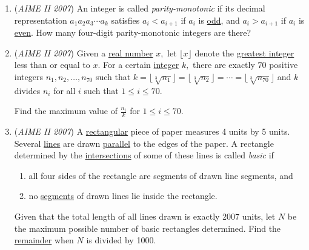\begin{enumerate}
 

	\item (\textit{AIME II 2007}) An integer is called \textit{parity-monotonic} if its decimal representation $a_{1}a_{2}a_{3}\cdots a_{k}$ satisfies $a_{i}<a_{i+1}$ if $a_{i}$ is \href{https://artofproblemsolving.com/wiki/index.php?title=Odd}{odd}, and $a_{i}>a_{i+1}$ if $a_{i}$ is \href{https://artofproblemsolving.com/wiki/index.php?title=Even}{even}. How many four-digit parity-monotonic integers are there? 


 

	\item (\textit{AIME II 2007}) Given a \href{https://artofproblemsolving.com/wiki/index.php?title=Real\_number}{real number} $x,$ let $\lfloor x \rfloor$ denote the \href{https://artofproblemsolving.com/wiki/index.php?title=Floor\_function}{greatest integer} less than or equal to $x.$ For a certain \href{https://artofproblemsolving.com/wiki/index.php?title=Integer}{integer} $k,$ there are exactly $70$ positive integers $n_{1}, n_{2}, \ldots, n_{70}$ such that $k=\lfloor\sqrt[3]{n_{1}}\rfloor = \lfloor\sqrt[3]{n_{2}}\rfloor = \cdots = \lfloor\sqrt[3]{n_{70}}\rfloor$ and $k$ divides $n_{i}$ for all $i$ such that $1 \leq i \leq 70.$


 Find the maximum value of $\frac{n_{i}}{k}$ for $1\leq i \leq 70.$


	\item (\textit{AIME II 2007}) A \href{https://artofproblemsolving.com/wiki/index.php?title=Rectangle}{rectangular} piece of paper measures 4 units by 5 units. Several \href{https://artofproblemsolving.com/wiki/index.php?title=Line}{lines} are drawn \href{https://artofproblemsolving.com/wiki/index.php?title=Parallel}{parallel} to the edges of the paper. A rectangle determined by the \href{https://artofproblemsolving.com/wiki/index.php?title=Intersection}{intersections} of some of these lines is called \textit{basic} if 


 
            \begin{enumerate}[label=(\roman*)]
                \item  all four sides of the rectangle are segments of drawn line segments, and
\item  no \href{https://artofproblemsolving.com/wiki/index.php?title=Segment}{segments} of drawn lines lie inside the rectangle.
            \end{enumerate}
            Given that the total length of all lines drawn is exactly 2007 units, let $N$ be the maximum possible number of basic rectangles determined. Find the \href{https://artofproblemsolving.com/wiki/index.php?title=Remainder}{remainder} when $N$ is divided by 1000.



\end{enumerate}
